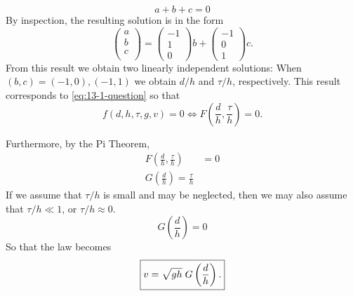 \documentclass[12pt,twoside]{article}
\begin{document}
\begin{enumerate}
    \begin{equation*}
      a + b + c = 0
    \end{equation*}
    By inspection, the resulting solution is in the form
    \begin{equation*}
      \begin{pmatrix}
        a \\ b \\ c \\
      \end{pmatrix} =
      \begin{pmatrix}
        -1 \\ 1 \\ 0
      \end{pmatrix}b +
      \begin{pmatrix}
        -1 \\ 0 \\ 1
      \end{pmatrix}c.
    \end{equation*}
    From this result we obtain two linearly independent solutions: When
    $(b,c)=(-1,0),(-1,1)$ we obtain $d/h$ and $\tau/h$, respectively. This result
    corresponds to \cref{eq:13-1-question} so that
    \begin{equation*}
      f(d,h,\tau,g,v) = 0 \Longleftrightarrow F\left(\frac{d}{h},\frac{\tau}{h}\right) = 0.
    \end{equation*}

    Furthermore, by the Pi Theorem,
    \begin{equation*}
      \begin{aligned}
        F\left(\frac{d}{h},\frac{\tau}{h}\right) &= 0 \\
        G\left(\frac{d}{h}\right) = \frac{\tau}{h}
      \end{aligned}
    \end{equation*}
    If we assume that $\tau/h$ is small and may be neglected, then we may also
    assume that $\tau/h \ll 1$, or $\tau/h \approx 0$.
    \begin{equation*}
      G\left(\frac{d}{h}\right) = 0
    \end{equation*}
    So that the law becomes
    \begin{equation} \boxed{
        \label{eq:13-1-new-law}
        v=\sqrt{gh}\; G\left(\frac{d}{h}\right).
      }
    \end{equation}


\end{enumerate}
\end{document}
